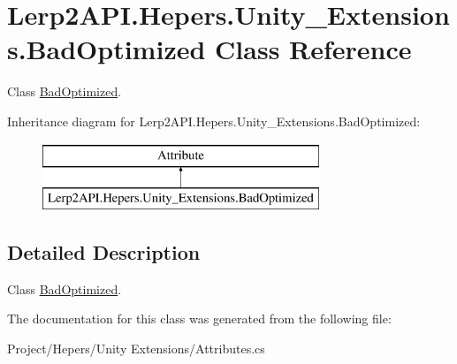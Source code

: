 \hypertarget{class_lerp2_a_p_i_1_1_hepers_1_1_unity___extensions_1_1_bad_optimized}{}\section{Lerp2\+A\+P\+I.\+Hepers.\+Unity\+\_\+\+Extensions.\+Bad\+Optimized Class Reference}
\label{class_lerp2_a_p_i_1_1_hepers_1_1_unity___extensions_1_1_bad_optimized}


Class \hyperlink{class_lerp2_a_p_i_1_1_hepers_1_1_unity___extensions_1_1_bad_optimized}{Bad\+Optimized}.  


Inheritance diagram for Lerp2\+A\+P\+I.\+Hepers.\+Unity\+\_\+\+Extensions.\+Bad\+Optimized\+:\begin{figure}[H]
\begin{center}
\leavevmode
\includegraphics[height=2.000000cm]{class_lerp2_a_p_i_1_1_hepers_1_1_unity___extensions_1_1_bad_optimized}
\end{center}
\end{figure}


\subsection{Detailed Description}
Class \hyperlink{class_lerp2_a_p_i_1_1_hepers_1_1_unity___extensions_1_1_bad_optimized}{Bad\+Optimized}. 



The documentation for this class was generated from the following file\+:\begin{DoxyCompactItemize}
\item 
Project/\+Hepers/\+Unity Extensions/Attributes.\+cs\end{DoxyCompactItemize}
